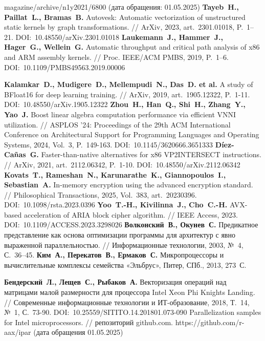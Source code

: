 \begin{thebibliography}{99}
magazine/archive/n1y2021/6800 (дата обращения: 01.05.2025)
%
\textbf{Tayeb~H., Paillat~L., Bramas~B.} Autovesk: Automatic vectorization of unstructured static kernels by graph transformations. // ArXiv, 2023, art.~2301.01018, P.~1–21. DOI:~10.48550/arXiv.2301.01018
%
\textbf{Laukemann~J., Hammer~J., Hager~G., Wellein~G.} Automatic throughput and critical path analysis of x86 and ARM assembly kernels. // Proc. IEEE/ACM PMBS, 2019, P.~1–6. DOI:~10.1109/PMBS49563.2019.00006
%



%
\textbf{Kalamkar~D., Mudigere~D., Mellempudi~N., Das~D. et al.} A study of BFloat16 for deep learning training. // ArXiv, 2019, art.~1905.12322, P.~1-11. DOI:~10.48550/arXiv.1905.12322
%
\textbf{Zhou~H., Han~Q., Shi~H., Zhang~Y., Yao~J.} Boost linear algebra computation performance via efficient VNNI utilization. // ASPLOS '24: Proceedings of the 29th ACM International Conference on Architectural Support for Programming Languages and Operating Systems, 2024, Vol.~3, P.~149-163. DOI:~10.1145/3620666.3651333
%
\textbf{D{\'i}ez-Ca{\~n}as~G.} Faster-than-native alternatives for x86 VP2INTERSECT instructions. // ArXiv, 2021, art.~2112.06342, P.~1-10. DOI:~10.48550/arXiv.2112.06342
%
\textbf{Kovats~T., Rameshan~N., Karunarathe~K., Giannopoulos~I., Sebastian~A.} In-memory encryption using the advanced encryption standard. // Philosophical Transactions, 2025, Vol.~383, art.~20230396. DOI:~10.1098/rsta.2023.0396
%
\textbf{Yoo~T.-H., Kivilinna~J., Cho~C.-H.} AVX-based acceleration of ARIA block cipher algorithm. // IEEE Access, 2023. DOI:~10.1109/ACCESS.2023.3298026
%
\textbf{Волконский~В., Окунев~С.} Предикатное представление как основа оптимизации программы для архитектур с явно выраженной параллельностью. // Информационные технологии, 2003, №~4, С.~36–45.
%
\textbf{Ким~А., Перекатов~В., Ермаков~С.} Микропроцессоры и вычислительные комплексы семейства «Эльбрус», Питер, СПб., 2013, 273~С.
%



%
\textbf{Бендерский~Л., Лещев~С., Рыбаков~А.} Векторизация операций над матрицами малой размерности для процессора Intel Xeon Phi Knights Landing. // Современные информационные технологии и ИТ-образование, 2018, Т.~14, №~1, С.~73-90. DOI:~10.25559/SITITO.14.201801.073-090
%
Parallelization samples for Intel microprocessors. // репозиторий github.com. https://github.com/r-aax/ipar (дата обращения 01.05.2025)
%




\end{thebibliography}
